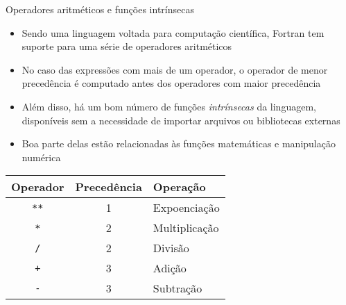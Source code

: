 \begin{frame}[fragile]{Operadores aritméticos e funções intrínsecas}

    \begin{itemize}
        \item Sendo uma linguagem voltada para computação científica, Fortran tem suporte para
            uma série de operadores aritméticos

        \item No caso das expressões com mais de um operador, o operador de menor precedência é
            computado antes dos operadores com maior precedência
        \item Além disso, há um bom número de funções \textit{intrínsecas} da linguagem, disponíveis
            sem a necessidade de importar arquivos ou bibliotecas externas

        \item Boa parte delas estão relacionadas às funções matemáticas e manipulação
            numérica
    \end{itemize}

    \begin{table}[ht]
        \centering
        \begin{tabular}{ccl}
            \toprule
            \textbf{Operador} & \textbf{Precedência} & \textbf{Operação} \\
            \midrule
                \texttt{**} & 1 & Expoenciação \\
                \texttt{*} & 2 & Multiplicação \\
                \texttt{/} & 2 & Divisão \\
                \texttt{+} & 3 & Adição \\
                \texttt{-} & 3 & Subtração \\
            \bottomrule
        \end{tabular}
    \end{table}
\end{frame}

